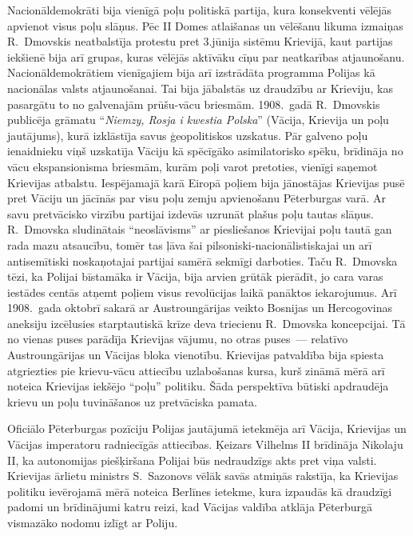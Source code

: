 \documentclass[twoside,a5paper,12pt,fleqn,openany]{extbook}
\newcommand{\pltxti}[1]{\textit{\textpolish{#1}}}
\begin{document}
Nacionāldemokrāti bija vienīgā poļu politiskā partija, kura konsekventi vēlējās apvienot visus poļu slāņus. Pēc II Domes atlaišanas un vēlēšanu likuma izmaiņas R.~Dmovskis neatbalstīja protestu pret 3.jūnija sistēmu Krievijā, kaut partijas iekšienē bija arī grupas, kuras vēlējās aktīvāku cīņu par neatkarības atjaunošanu. Nacionāldemokrātiem vienīgajiem bija arī izstrādāta programma Polijas kā nacionālas valsts atjaunošanai. Tai bija jābalstās uz draudzību ar Krieviju, kas pasargātu to no galvenajām prūšu-vācu briesmām. 1908.~gadā R.~Dmovskis publicēja grāmatu ``\pltxti{Niemzy, Rosja i kwestia Polska}'' (Vācija, Krievija un poļu jautājums), kurā izklāstīja savus ģeopolitiskos uzskatus. Pār galveno poļu ienaidnieku viņš uzskatīja Vāciju kā spēcīgāko asimilatorisko spēku, brīdināja no vācu ekspansionisma briesmām, kurām poļi varot pretoties, vienīgi saņemot Krievijas atbalstu. Iespējamajā karā Eiropā poļiem bija jānostājas Krievijas pusē pret Vāciju un jācīnās par visu poļu zemju apvienošanu Pēterburgas varā. Ar savu pretvācisko virzību partijai izdevās uzrunāt plašus poļu tautas slāņus. R.~Dmovska sludinātais ``neoslāvisms'' ar piesliešanos Krievijai poļu tautā gan rada mazu atsaucību, tomēr tas ļāva šai pilsoniski-nacionālistiskajai un arī antisemītiski noskaņotajai partijai samērā sekmīgi darboties. Taču R.~Dmovska tēzi, ka Polijai bīstamāka ir Vācija, bija arvien grūtāk pierādīt, jo cara varas iestādes centās atņemt poļiem visus revolūcijas laikā panāktos iekarojumus. Arī 1908.~gada oktobrī sakarā ar Austroungārijas veikto Bosnijas un Hercogovinas aneksiju izcēlusies starptautiskā krīze deva triecienu R.~Dmovska koncepcijai. Tā no vienas puses parādīja Krievijas vājumu, no otras puses~--- relatīvo Austroungārijas un Vācijas bloka vienotību. Krievijas patvaldība bija spiesta atgriezties pie krievu-vācu attiecību uzlabošanas kursa, kurš zināmā mērā arī noteica Krievijas iekšējo ``poļu'' politiku. Šāda perspektīva būtiski apdraudēja krievu un poļu tuvināšanos uz pretvāciska pamata.

Oficiālo Pēterburgas pozīciju Polijas jautājumā ietekmēja arī Vācija, Krievijas un Vācijas imperatoru radniecīgās attiecības. Ķeizars Vilhelms II brīdināja Nikolaju II, ka autonomijas piešķiršana Polijai būs nedraudzīgs akts pret viņa valsti. Krievijas ārlietu ministrs S.~Sazonovs vēlāk savās atmiņās rakstīja, ka Krievijas politiku ievērojamā mērā noteica Berlīnes ietekme, kura izpaudās kā draudzīgi padomi un brīdinājumi katru reizi, kad Vācijas valdība atklāja Pēterburgā vismazāko nodomu izlīgt ar Poliju.
\end{document}

